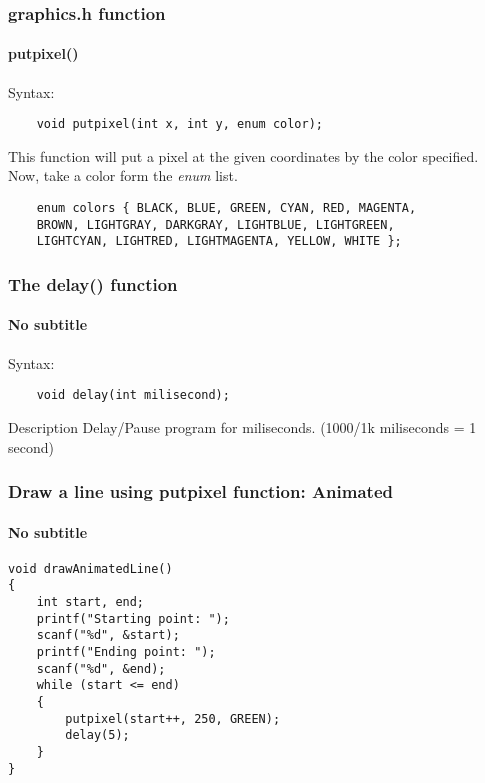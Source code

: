 \begin{frame}[fragile]
	\frametitle{graphics.h function}
	\framesubtitle{putpixel()}
	\pause
	\alert{Syntax:}
\begin{lstlisting}
	void putpixel(int x, int y, enum color);
\end{lstlisting}
\pause
This function will put a pixel at the given coordinates by the color specified.\pause \\
Now, take a color form the \emph{enum} list.
\begin{lstlisting}
	enum colors { BLACK, BLUE, GREEN, CYAN, RED, MAGENTA,
	BROWN, LIGHTGRAY, DARKGRAY, LIGHTBLUE, LIGHTGREEN,
	LIGHTCYAN, LIGHTRED, LIGHTMAGENTA, YELLOW, WHITE };
\end{lstlisting}
\end{frame}

\begin{frame}[fragile]
\frametitle{The delay() function}
\framesubtitle{No subtitle}
\pause
\alert{Syntax:}
\begin{lstlisting}
	void delay(int milisecond);
\end{lstlisting}
\pause
\begin{block}{Description}
Delay/Pause program for miliseconds. (1000/1k miliseconds = 1 second)
\end{block}
\end{frame}

\begin{frame}[fragile]
\frametitle{Draw a line using putpixel function: Animated}
\framesubtitle{No subtitle}
\pause
\begin{lstlisting}[caption=Animated Line, basicstyle=\small]
void drawAnimatedLine()
{
    int start, end;
    printf("Starting point: ");
    scanf("%d", &start);
    printf("Ending point: ");
    scanf("%d", &end);
    while (start <= end)
    {
        putpixel(start++, 250, GREEN);
        delay(5);
    }
}
\end{lstlisting}
\end{frame}

